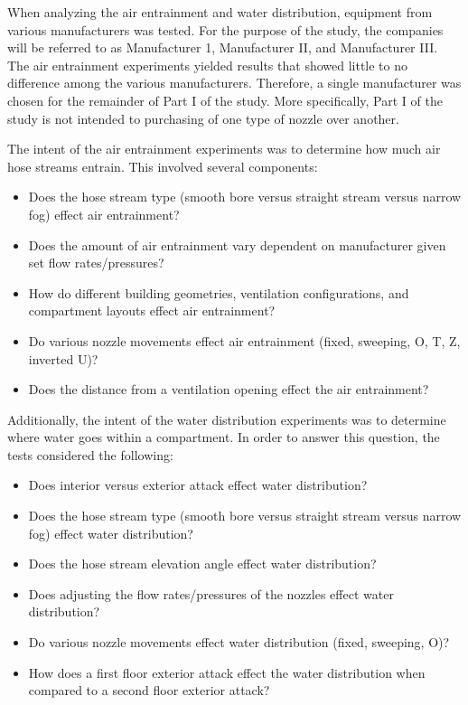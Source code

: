 \documentclass{article}
\begin{document}
When analyzing the air entrainment and water distribution, equipment from various manufacturers was tested. For the purpose of the study, the companies will be referred to as Manufacturer 1, Manufacturer II, and Manufacturer III. The air entrainment experiments yielded results that showed little to no difference among the various manufacturers. Therefore, a single manufacturer was chosen for the remainder of Part I of the study. More specifically, Part I of the study is not intended to purchasing of one type of nozzle over another.

The intent of the air entrainment experiments was to determine how much air hose streams entrain. This involved several components:

\begin{itemize}
	\item Does the hose stream type (smooth bore versus straight stream versus narrow fog) effect air entrainment?
	\item Does the amount of air entrainment vary dependent on manufacturer given set flow rates/pressures?
	\item How do different building geometries, ventilation configurations, and compartment layouts effect air entrainment?
	\item Do various nozzle movements effect air entrainment (fixed, sweeping, O, T, Z, inverted U)?
	\item Does the distance from a ventilation opening effect the air entrainment?

\end{itemize}

Additionally, the intent of the water distribution experiments was to determine where water goes within a compartment. In order to answer this question, the tests considered the following:

\begin{itemize}
	\item Does interior versus exterior attack effect water distribution?
	\item Does the hose stream type (smooth bore versus straight stream versus narrow fog) effect water distribution? 
	\item Does the hose stream elevation angle effect water distribution?
	\item Does adjusting the flow rates/pressures of the nozzles effect water distribution? 
	\item Do various nozzle movements effect water distribution (fixed, sweeping, O)?
	\item How does a first floor exterior attack effect the water distribution when compared to a second floor exterior attack?
\end{itemize}
\end{document}
